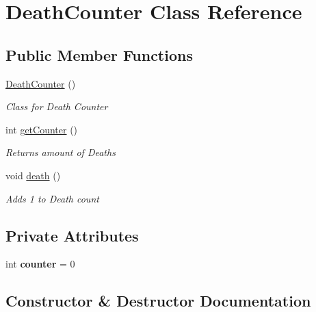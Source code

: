 \hypertarget{class_death_counter}{}\section{Death\+Counter Class Reference}
\label{class_death_counter}
\subsection*{Public Member Functions}
\begin{DoxyCompactItemize}
\item 
\mbox{\hyperlink{class_death_counter_a42064ff9ce82f9b7c2aba1db029b42f9}{Death\+Counter}} ()
\begin{DoxyCompactList}\small\item\em Class for Death Counter \end{DoxyCompactList}\item 
int \mbox{\hyperlink{class_death_counter_a002c6fc9533e6fd3499590b24a2104ad}{get\+Counter}} ()
\begin{DoxyCompactList}\small\item\em Returns amount of Deaths \end{DoxyCompactList}\item 
void \mbox{\hyperlink{class_death_counter_a7c8c490a0dd1c935fc0de01ff2eec278}{death}} ()
\begin{DoxyCompactList}\small\item\em Adds 1 to Death count \end{DoxyCompactList}\end{DoxyCompactItemize}
\subsection*{Private Attributes}
\begin{DoxyCompactItemize}
\item 
\mbox{\label{class_death_counter_a7bc1dce87198b751807dc418661248c5}} 
int {\bfseries counter} = 0
\end{DoxyCompactItemize}


\subsection{Constructor \& Destructor Documentation}
\mbox{\label{class_death_counter_a42064ff9ce82f9b7c2aba1db029b42f9}} 
